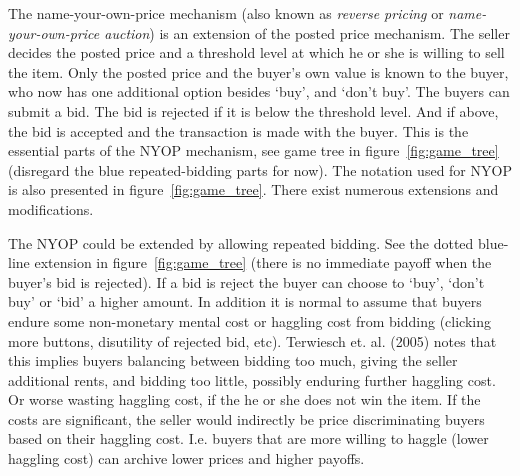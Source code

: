 \documentclass[a4paper,12pt]{article}
\begin{document}
	The name-your-own-price mechanism (also known as {\it reverse pricing} or {\it name-your-own-price auction}) is an extension of the posted price mechanism. The seller decides the posted price and a threshold level at which he or she is willing to sell the item. Only the posted price and the buyer's own value is known to the buyer, who now has one additional option besides `buy', and `don't buy'. The buyers can submit a bid. The bid is rejected if it is below the threshold level. And if above, the bid is accepted and the transaction is made with the buyer. This is the essential parts of the NYOP mechanism, see game tree in figure~\ref{fig:game_tree} (disregard the blue repeated-bidding parts for now). The notation used for NYOP is also presented in figure~\ref{fig:game_tree}. There exist numerous extensions and modifications. %
	
	The NYOP could be extended by allowing repeated bidding. See the dotted blue-line extension in figure~\ref{fig:game_tree} (there is no immediate payoff when the buyer's bid is rejected). If a bid is reject the buyer can choose to `buy', `don't buy' or `bid' a higher amount. In addition it is normal to assume that buyers endure some non-monetary mental cost or haggling cost from bidding (clicking more buttons, disutility of rejected bid, etc). Terwiesch et. al. (2005) notes that this implies buyers balancing between bidding too much, giving the seller additional rents, and bidding too little, possibly enduring further haggling cost. Or worse wasting haggling cost, if the he or she does not win the item. If the costs are significant, the seller would indirectly be price discriminating buyers based on their haggling cost. I.e. buyers that are more willing to haggle (lower haggling cost) can archive lower prices and higher payoffs. %
\end{document}
